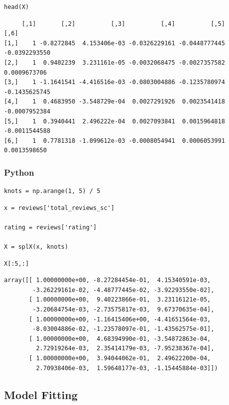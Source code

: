 \documentclass[
  letterpaper,
]{krantz}
\begin{document}
\begin{verbatim}
head(X)
\end{verbatim}

\begin{verbatim}
     [,1]       [,2]          [,3]          [,4]          [,5]          [,6]
[1,]    1 -0.8272845  4.153406e-03 -0.0326229161 -0.0448777445 -0.0392293550
[2,]    1  0.9402239  3.231161e-05 -0.0032068475 -0.0027357582  0.0009673706
[3,]    1 -1.1641541 -4.416516e-03 -0.0803004886 -0.1235780974 -0.1435625745
[4,]    1  0.4683950 -3.548729e-04  0.0027291926  0.0023541418 -0.0007952384
[5,]    1  0.3940441  2.496222e-04  0.0027093841  0.0015964818 -0.0011544588
[6,]    1  0.7781318 -1.099612e-03 -0.0008054941  0.0006053991  0.0013598650
\end{verbatim}

\subsubsection{Python}

\begin{verbatim}
knots = np.arange(1, 5) / 5
\end{verbatim}

\begin{verbatim}
x = reviews['total_reviews_sc']

rating = reviews['rating']

X = splX(x, knots)
\end{verbatim}

\begin{verbatim}
X[:5,:]
\end{verbatim}

\begin{verbatim}
array([[ 1.00000000e+00, -8.27284454e-01,  4.15340591e-03,
        -3.26229161e-02, -4.48777445e-02, -3.92293550e-02],
       [ 1.00000000e+00,  9.40223866e-01,  3.23116121e-05,
        -3.20684754e-03, -2.73575817e-03,  9.67370635e-04],
       [ 1.00000000e+00, -1.16415406e+00, -4.41651564e-03,
        -8.03004886e-02, -1.23578097e-01, -1.43562575e-01],
       [ 1.00000000e+00,  4.68394990e-01, -3.54872863e-04,
         2.72919264e-03,  2.35414179e-03, -7.95238367e-04],
       [ 1.00000000e+00,  3.94044062e-01,  2.49622200e-04,
         2.70938406e-03,  1.59648177e-03, -1.15445884e-03]])
\end{verbatim}

\subsection{Model Fitting}\label{sec-gam-model-fitting}
\end{document}
